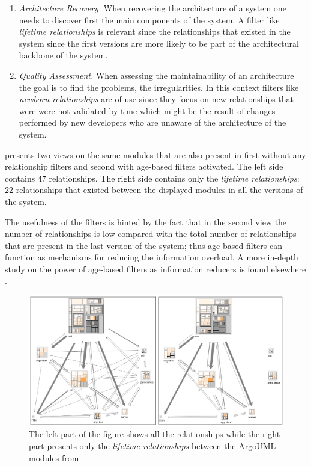 \documentclass[preprint,12pt]{elsarticle}
\newcommand\on[1]{\nbc{ON}{#1}{red}} %
\begin{document}
\begin{enumerate}

\item {\em Architecture Recovery.} When recovering the architecture of a system one needs to discover first the main components of the system. A filter like {\em lifetime relationships} is relevant since the relationships that existed in the system since the first versions are more likely to be part of the architectural backbone of the system. %

\item {\em Quality Assessment.} When assessing the maintainability of an architecture the goal is to find the problems, the irregularities. In this context filters like {\em newborn relationships} are of use since they focus on new relationships that were were not validated by time which might be the result of changes performed by new developers who are unaware of the architecture of the system. %

\end{enumerate}

 presents two views on the same modules that are also present in  first without any relationship filters and second with age-based filters activated. The left side contains 47 relationships. The right side contains only the {\em lifetime relationships}: 22 relationships that existed between the displayed modules in all the versions of the system. 

The usefulness of the filters is hinted by the fact that in the second view the number of relationships is low compared with the total number of relationships that are present in the last version of the system; thus age-based filters can function as mechanisms for reducing the information overload. A more in-depth study on the power of age-based filters as information reducers is found elsewhere \cite{lungu-relevo}.

\begin{figure}
\begin{center}
\includegraphics[width=\linewidth]{Architecture-LifetimeVsRecent}
\caption{The left part of the figure shows all the relationships while the right part presents only the {\em lifetime relationships} between the ArgoUML modules from }
\end{center}
\end{figure}
\end{document}
